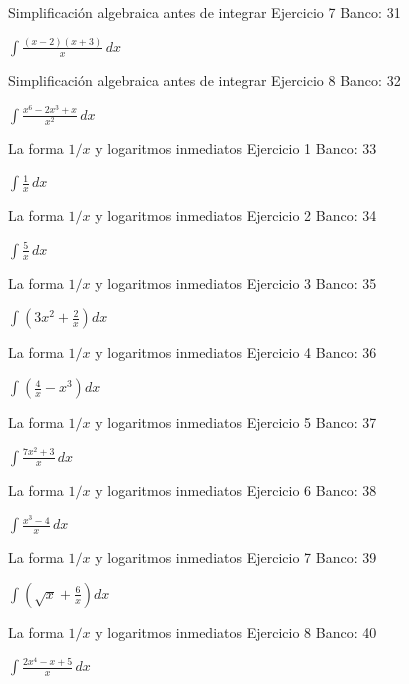 \documentclass[aspectratio=169,12pt]{beamer}
\newcommand{\ejercicio}[1]{%
  \begin{center}
  \vfill
  {\fontsize{24}{30}\selectfont #1}
  \vfill
  \end{center}
}
\begin{document}
\begin{frame}{Simplificación algebraica antes de integrar}
\small Ejercicio 7 \hfill Banco: 31
\ejercicio{$\displaystyle \int\frac{(x-2)(x+3)}{x}\,dx$}
\end{frame}

\begin{frame}{Simplificación algebraica antes de integrar}
\small Ejercicio 8 \hfill Banco: 32
\ejercicio{$\displaystyle \int\frac{x^6-2x^3+x}{x^2}\,dx$}
\end{frame}

\begin{frame}{La forma $1/x$ y logaritmos inmediatos}
\small Ejercicio 1 \hfill Banco: 33
\ejercicio{$\displaystyle \int\frac{1}{x}\,dx$}
\end{frame}

\begin{frame}{La forma $1/x$ y logaritmos inmediatos}
\small Ejercicio 2 \hfill Banco: 34
\ejercicio{$\displaystyle \int\frac{5}{x}\,dx$}
\end{frame}

\begin{frame}{La forma $1/x$ y logaritmos inmediatos}
\small Ejercicio 3 \hfill Banco: 35
\ejercicio{$\displaystyle \int\left(3x^2+\frac{2}{x}\right)dx$}
\end{frame}

\begin{frame}{La forma $1/x$ y logaritmos inmediatos}
\small Ejercicio 4 \hfill Banco: 36
\ejercicio{$\displaystyle \int\left(\frac{4}{x}-x^3\right)dx$}
\end{frame}

\begin{frame}{La forma $1/x$ y logaritmos inmediatos}
\small Ejercicio 5 \hfill Banco: 37
\ejercicio{$\displaystyle \int\frac{7x^2+3}{x}\,dx$}
\end{frame}

\begin{frame}{La forma $1/x$ y logaritmos inmediatos}
\small Ejercicio 6 \hfill Banco: 38
\ejercicio{$\displaystyle \int\frac{x^3-4}{x}\,dx$}
\end{frame}

\begin{frame}{La forma $1/x$ y logaritmos inmediatos}
\small Ejercicio 7 \hfill Banco: 39
\ejercicio{$\displaystyle \int\left(\sqrt{x}+\frac{6}{x}\right)dx$}
\end{frame}

\begin{frame}{La forma $1/x$ y logaritmos inmediatos}
\small Ejercicio 8 \hfill Banco: 40
\ejercicio{$\displaystyle \int\frac{2x^4-x+5}{x}\,dx$}
\end{frame}
\end{document}
